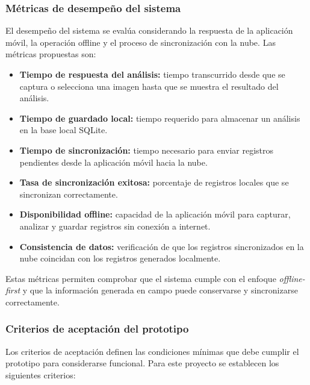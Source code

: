 \subsubsection{Métricas de desempeño del sistema}

El desempeño del sistema se evalúa considerando la respuesta de la aplicación móvil, la operación offline y el proceso de sincronización con la nube. Las métricas propuestas son:

\begin{itemize}
    \item \textbf{Tiempo de respuesta del análisis:} tiempo transcurrido desde que se captura o selecciona una imagen hasta que se muestra el resultado del análisis.
    \item \textbf{Tiempo de guardado local:} tiempo requerido para almacenar un análisis en la base local SQLite.
    \item \textbf{Tiempo de sincronización:} tiempo necesario para enviar registros pendientes desde la aplicación móvil hacia la nube.
    \item \textbf{Tasa de sincronización exitosa:} porcentaje de registros locales que se sincronizan correctamente.
    \item \textbf{Disponibilidad offline:} capacidad de la aplicación móvil para capturar, analizar y guardar registros sin conexión a internet.
    \item \textbf{Consistencia de datos:} verificación de que los registros sincronizados en la nube coincidan con los registros generados localmente.
\end{itemize}

Estas métricas permiten comprobar que el sistema cumple con el enfoque \textit{offline-first} y que la información generada en campo puede conservarse y sincronizarse correctamente.

\subsubsection{Criterios de aceptación del prototipo}

Los criterios de aceptación definen las condiciones mínimas que debe cumplir el prototipo para considerarse funcional. Para este proyecto se establecen los siguientes criterios:

